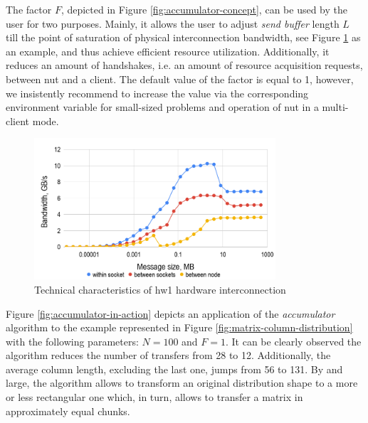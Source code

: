 The factor $F$, depicted in Figure \ref{fig:accumulator-concept}, can be used by the user for two purposes. Mainly, it allows the user to adjust  \textit{send buffer} length $L$ till the point of saturation of physical interconnection bandwidth, see Figure \ref{fig:hw1-bandwidth} as an example, and thus achieve efficient resource utilization. Additionally, it reduces an amount of handshakes, i.e. an amount of resource acquisition requests, between \acrshort{nut} and a client. The default value of the factor is equal to 1, however, we insistently recommend to increase the value via the corresponding environment variable for small-sized problems and operation of \acrshort{nut} in a multi-client mode.\\


\begin{figure}[htpb]
  \centering
  \includegraphics[width=0.8\textwidth]{figures/chapter-3/hw1-bandwidth.png}
  \caption{Technical characteristics of  \gls{hw1} hardware interconnection} \label{fig:hw1-bandwidth}
\end{figure}



Figure \ref{fig:accumulator-in-action} depicts an application of the \textit{accumulator} algorithm to the example represented in Figure \ref{fig:matrix-column-distribution} with the following parameters: $N = 100$ and $F = 1$. It can be clearly observed the algorithm reduces the number of transfers from 28 to 12. Additionally, the average column length, excluding the last one, jumps from 56 to 131. By and large, the algorithm allows to transform an original distribution shape to a more or less rectangular one which, in turn, allows to transfer a matrix in approximately equal chunks.\\



